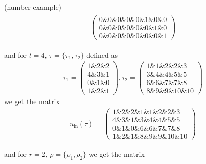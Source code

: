 \begin{example}{(number example)}
\begin{align*}
\begin{array}{rr}
\begin{pmatrix}
0 \ampersand 0 \ampersand 0 \ampersand 0 \ampersand 0 \ampersand 1 \ampersand 0 \ampersand 0 \\
0 \ampersand 0 \ampersand 0 \ampersand 0 \ampersand 0 \ampersand 0 \ampersand 1 \ampersand 0 \\
0 \ampersand 0 \ampersand 0 \ampersand 0 \ampersand 0 \ampersand 0 \ampersand 0 \ampersand 1
\end{pmatrix}
\end{array}
\end{align*}
\begin{minipage}[t]{.5\textwidth}
and for $t = 4$, $\tau = \{\tau_{1}, \tau_{2}\}$ defined as
\begin{align*}
\tau_{1} = \begin{pmatrix}
1 \ampersand 2 \ampersand 2 \\
4 \ampersand 3 \ampersand 1 \\
0 \ampersand 1 \ampersand 0 \\
1 \ampersand 2 \ampersand 1
\end{pmatrix},
\tau_{2} = \begin{pmatrix}
1 \ampersand 1 \ampersand 2 \ampersand 2 \ampersand 3 \\
3 \ampersand 4 \ampersand 4 \ampersand 5 \ampersand 5 \\
6 \ampersand 6 \ampersand 7 \ampersand 7 \ampersand 8 \\
8 \ampersand 9 \ampersand 9 \ampersand 10 \ampersand 10
\end{pmatrix}
\end{align*}
we get the matrix
\begin{align*}
u_{\text{in}}(\tau) = \begin{pmatrix}
1 \ampersand 2 \ampersand 2 \ampersand 1 \ampersand 1 \ampersand 2 \ampersand 2 \ampersand 3 \\
4 \ampersand 3 \ampersand 1 \ampersand 3 \ampersand 4 \ampersand 4 \ampersand 5 \ampersand 5 \\
0 \ampersand 1 \ampersand 0 \ampersand 6 \ampersand 6 \ampersand 7 \ampersand 7 \ampersand 8 \\
1 \ampersand 2 \ampersand 1 \ampersand 8 \ampersand 9 \ampersand 9 \ampersand 10 \ampersand 10
\end{pmatrix}
\end{align*}
\end{minipage}
\begin{minipage}[t]{.5\textwidth}
and for $r = 2$, $\rho = \{\rho_{1}, \rho_{2}\}$ we get the matrix
\begin{align*}

\end{align*}
\end{minipage}
\end{example}
